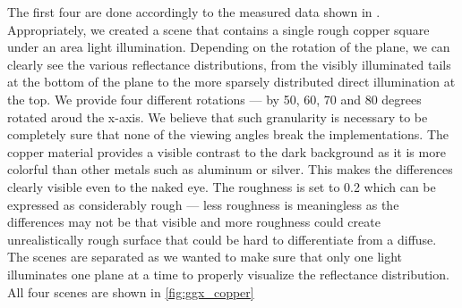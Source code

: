 The first four are done accordingly to the measured data shown in \citet{walter2007microfacet}. Appropriately, we created a scene that contains a single rough copper square under an area light illumination. Depending on the rotation of the plane, we can clearly see the various reflectance distributions, from the visibly illuminated tails at the bottom of the plane to the more sparsely distributed direct illumination at the top. We provide four different rotations --- by 50, 60, 70 and 80 degrees rotated aroud the x-axis. We believe that such granularity is necessary to be completely sure that none of the viewing angles break the implementations. The copper material provides a visible contrast to the dark background as it is more colorful than other metals such as aluminum or silver. This makes the differences clearly visible even to the naked eye. The roughness is set to 0.2 which can be expressed as considerably rough --- less roughness is meaningless as the differences may not be that visible and more roughness could create unrealistically rough surface that could be hard to differentiate from a diffuse. The scenes are separated as we wanted to make sure that only one light illuminates one plane at a time to properly visualize the reflectance distribution. All four scenes are shown in \autoref{fig:ggx_copper}

